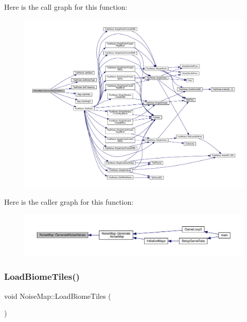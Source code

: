 Here is the call graph for this function\+:
\nopagebreak
\begin{figure}[H]
\begin{center}
\leavevmode
\includegraphics[width=350pt]{d1/dd4/class_noise_map_aa9ba8032c97f9a5ea9f63c697b2f20e4_cgraph}
\end{center}
\end{figure}
Here is the caller graph for this function\+:
\nopagebreak
\begin{figure}[H]
\begin{center}
\leavevmode
\includegraphics[width=350pt]{d1/dd4/class_noise_map_aa9ba8032c97f9a5ea9f63c697b2f20e4_icgraph}
\end{center}
\end{figure}
\mbox{\label{class_noise_map_ad8e07b9a0fc70191c781f1cdfef66b54}} 
\subsubsection{\texorpdfstring{Load\+Biome\+Tiles()}{LoadBiomeTiles()}}
{\footnotesize\ttfamily void Noise\+Map\+::\+Load\+Biome\+Tiles (\begin{DoxyParamCaption}{ }\end{DoxyParamCaption})}

